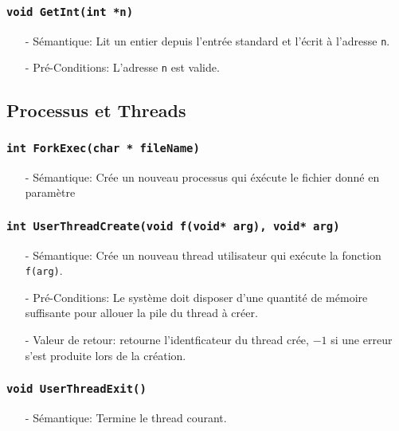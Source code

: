 \documentclass[11pt]{article}
\begin{document}
\subsubsection{\texttt{void GetInt(int *n)}}
\begin{itemize}
\item[-] Sémantique: Lit un entier depuis l'entrée standard et l'écrit à l'adresse \texttt{n}.
\item[-] Pré-Conditions: L'adresse \texttt{n} est valide.
\end{itemize}

\subsection{Processus et Threads}

\subsubsection{\texttt{int ForkExec(char * fileName)}}
 \begin{itemize}
 \item[-] Sémantique: Crée un nouveau processus qui éxécute le fichier donné en paramètre
 \end{itemize}

\subsubsection{\texttt{int UserThreadCreate(void f(void* arg), void* arg)}}
\begin{itemize}
\item[-] Sémantique: Crée un nouveau thread utilisateur qui exécute la fonction \texttt{f(arg)}.
\item[-] Pré-Conditions: Le système doit disposer d'une quantité de mémoire suffisante pour allouer la
  pile du thread à créer. 
\item[-] Valeur de retour: retourne l'identficateur du thread crée, $-1$ si une erreur s'est produite lors de
  la création.
\end{itemize}

\subsubsection{\texttt{void UserThreadExit()}}
\begin{itemize}
\item[-] Sémantique: Termine le thread courant.
\end{itemize}
\end{document}

